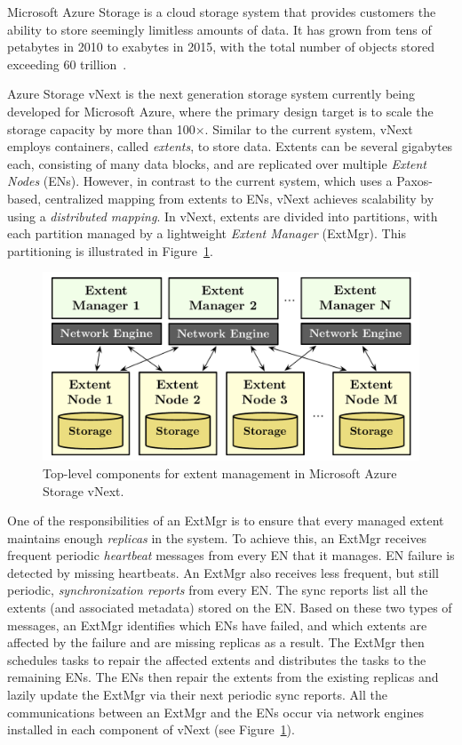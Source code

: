 Microsoft Azure Storage is a cloud storage system that provides customers the ability to store seemingly limitless amounts of data. It has grown from tens of petabytes in 2010 to exabytes in 2015, with the total number of objects stored exceeding 60 trillion~\cite{greenberg2015keynote}.

Azure Storage vNext is the next generation storage system currently being developed for Microsoft Azure, where the primary design target is to scale the storage capacity by more than 100$\times$. Similar to the current system, vNext employs containers, called \emph{extents}, to store data. Extents can be several gigabytes each, consisting of many data blocks, and are replicated over multiple \emph{Extent Nodes} (ENs). However, in contrast to the current system, which uses a Paxos-based, centralized mapping from extents to ENs, vNext achieves scalability by using a \emph{distributed mapping}. In vNext, extents are divided into partitions, with each partition managed by a lightweight \emph{Extent Manager} (ExtMgr). This partitioning is illustrated in Figure~\ref{fig:vnext}.

\begin{figure}[t]
\centering
\includegraphics[width=\linewidth]{img/azurestore}
\vspace{-5mm}
\caption{Top-level components for extent management in Microsoft Azure Storage vNext.}
\label{fig:vnext}
\vspace{-2mm}
\end{figure}

One of the responsibilities of an ExtMgr is to ensure that every managed extent maintains enough \emph{replicas} in the system. To achieve this, an ExtMgr receives frequent periodic \emph{heartbeat} messages from every EN that it manages. EN failure is detected by missing heartbeats. An ExtMgr also receives less frequent, but still periodic, \emph{synchronization reports} from every EN. The sync reports list all the extents (and associated metadata) stored on the EN. Based on these two types of messages, an ExtMgr identifies which ENs have failed, and which extents are affected by the failure and are missing replicas as a result. The ExtMgr then schedules tasks to repair the affected extents and distributes the tasks to the remaining ENs. The ENs then repair the extents from the existing replicas and lazily update the ExtMgr via their next periodic sync reports. All the communications between an ExtMgr and the ENs occur via network engines installed in each component of vNext (see Figure~\ref{fig:vnext}).

